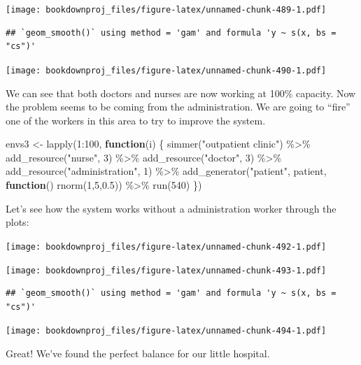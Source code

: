 \documentclass[
]{book}
\newenvironment{Shaded}{\begin{snugshade}}{\end{snugshade}}
\newcommand{\ControlFlowTok}[1]{\textcolor[rgb]{0.13,0.29,0.53}{\textbf{#1}}}
\newcommand{\DecValTok}[1]{\textcolor[rgb]{0.00,0.00,0.81}{#1}}
\newcommand{\FloatTok}[1]{\textcolor[rgb]{0.00,0.00,0.81}{#1}}
\newcommand{\FunctionTok}[1]{\textcolor[rgb]{0.00,0.00,0.00}{#1}}
\newcommand{\NormalTok}[1]{#1}
\newcommand{\OtherTok}[1]{\textcolor[rgb]{0.56,0.35,0.01}{#1}}
\newcommand{\SpecialCharTok}[1]{\textcolor[rgb]{0.00,0.00,0.00}{#1}}
\newcommand{\StringTok}[1]{\textcolor[rgb]{0.31,0.60,0.02}{#1}}
\theoremstyle{definition}
\theoremstyle{definition}
\theoremstyle{definition}
\theoremstyle{definition}
\theoremstyle{remark}
\begin{document}
\texttt{[image: bookdownproj\_files/figure-latex/unnamed-chunk-489-1.pdf]}

\begin{verbatim}
## `geom_smooth()` using method = 'gam' and formula 'y ~ s(x, bs = "cs")'
\end{verbatim}

\texttt{[image: bookdownproj\_files/figure-latex/unnamed-chunk-490-1.pdf]}

We can see that both doctors and nurses are now working at 100\% capacity. Now the problem seems to be coming from the administration. We are going to ``fire'' one of the workers in this area to try to improve the system.

\begin{Shaded}
\begin{Highlighting}[]
\NormalTok{envs3 }\OtherTok{\textless{}{-}} \FunctionTok{lapply}\NormalTok{(}\DecValTok{1}\SpecialCharTok{:}\DecValTok{100}\NormalTok{, }\ControlFlowTok{function}\NormalTok{(i) \{}
  \FunctionTok{simmer}\NormalTok{(}\StringTok{"outpatient clinic"}\NormalTok{) }\SpecialCharTok{\%\textgreater{}\%}
    \FunctionTok{add\_resource}\NormalTok{(}\StringTok{"nurse"}\NormalTok{, }\DecValTok{3}\NormalTok{) }\SpecialCharTok{\%\textgreater{}\%}
    \FunctionTok{add\_resource}\NormalTok{(}\StringTok{"doctor"}\NormalTok{, }\DecValTok{3}\NormalTok{) }\SpecialCharTok{\%\textgreater{}\%}
    \FunctionTok{add\_resource}\NormalTok{(}\StringTok{"administration"}\NormalTok{, }\DecValTok{1}\NormalTok{) }\SpecialCharTok{\%\textgreater{}\%}
    \FunctionTok{add\_generator}\NormalTok{(}\StringTok{"patient"}\NormalTok{, patient, }\ControlFlowTok{function}\NormalTok{() }\FunctionTok{rnorm}\NormalTok{(}\DecValTok{1}\NormalTok{,}\DecValTok{5}\NormalTok{,}\FloatTok{0.5}\NormalTok{)) }\SpecialCharTok{\%\textgreater{}\%}
    \FunctionTok{run}\NormalTok{(}\DecValTok{540}\NormalTok{)}
\NormalTok{\})}
\end{Highlighting}
\end{Shaded}

Let's see how the system works without a administration worker through the plots:

\texttt{[image: bookdownproj\_files/figure-latex/unnamed-chunk-492-1.pdf]}

\texttt{[image: bookdownproj\_files/figure-latex/unnamed-chunk-493-1.pdf]}

\begin{verbatim}
## `geom_smooth()` using method = 'gam' and formula 'y ~ s(x, bs = "cs")'
\end{verbatim}

\texttt{[image: bookdownproj\_files/figure-latex/unnamed-chunk-494-1.pdf]}

Great! We've found the perfect balance for our little hospital.

  
\end{document}
